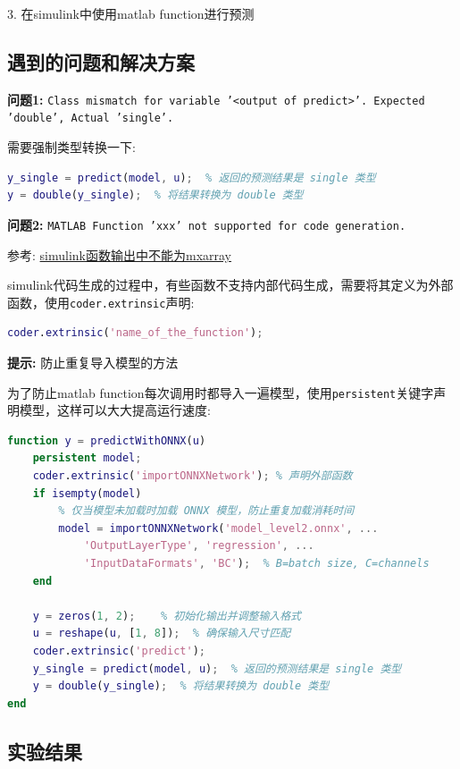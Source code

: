 \documentclass[12pt,a4paper,UTF8]{article}
\begin{document}
3. 在simulink中使用matlab function进行预测

\subsection{遇到的问题和解决方案}

\textbf{问题1:} \texttt{Class mismatch for variable '<output of predict>'. Expected 'double', Actual 'single'.}

需要强制类型转换一下:
\begin{lstlisting}[language=Matlab]
y_single = predict(model, u);  % 返回的预测结果是 single 类型
y = double(y_single);  % 将结果转换为 double 类型
\end{lstlisting}

\textbf{问题2:} \texttt{MATLAB Function 'xxx' not supported for code generation.}

参考: \href{https://blog.csdn.net/qq_38146340/article/details/118675853}{simulink函数输出中不能为mxarray}

simulink代码生成的过程中，有些函数不支持内部代码生成，需要将其定义为外部函数，使用\texttt{coder.extrinsic}声明:
\begin{lstlisting}[language=Matlab]
coder.extrinsic('name_of_the_function');
\end{lstlisting}

\textbf{提示:} 防止重复导入模型的方法

为了防止matlab function每次调用时都导入一遍模型，使用\texttt{persistent}关键字声明模型，这样可以大大提高运行速度:

\begin{lstlisting}[language=Matlab]
function y = predictWithONNX(u)
    persistent model; 
    coder.extrinsic('importONNXNetwork'); % 声明外部函数
    if isempty(model)
        % 仅当模型未加载时加载 ONNX 模型，防止重复加载消耗时间
        model = importONNXNetwork('model_level2.onnx', ...
            'OutputLayerType', 'regression', ...
            'InputDataFormats', 'BC');  % B=batch size, C=channels
    end

    y = zeros(1, 2);    % 初始化输出并调整输入格式
    u = reshape(u, [1, 8]);  % 确保输入尺寸匹配
    coder.extrinsic('predict');
    y_single = predict(model, u);  % 返回的预测结果是 single 类型
    y = double(y_single);  % 将结果转换为 double 类型
end
\end{lstlisting}

\subsection{实验结果}
\end{document}

